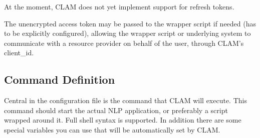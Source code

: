 \documentclass[a4paper,12pt,twoside,openright]{report}
\begin{document}
At the moment, CLAM does not yet implement support for refresh tokens.

The unencrypted access token may be passed to the wrapper script if needed (has
to be explicitly configured), allowing the wrapper script or underlying system
to communicate with a resource provider on behalf of the user, through CLAM's
client\_id.

\subsection{Command Definition} \label{sec:command}

Central in the configuration file is the command that CLAM will execute. This
command should start the actual NLP application, or preferably a script wrapped
around it. Full shell syntax is supported. In addition there are some special
variables you can use that will be automatically set by CLAM. 
\end{document}
